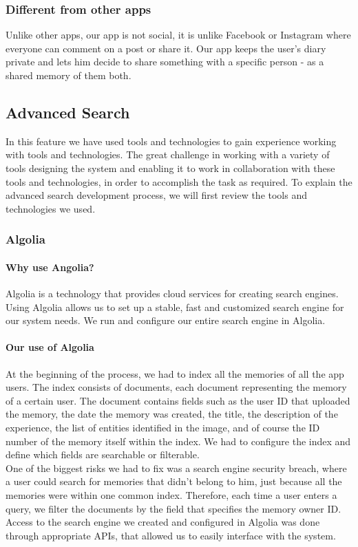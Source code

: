 \documentclass{article}
\begin{document}
 \subsubsection{Different from other apps}
 Unlike other apps, our app is not social, it is unlike Facebook or Instagram where everyone can comment on a post or share it. Our app keeps the user's diary private and lets him decide to share something with a specific person - as a shared memory of them both.

\subsection{Advanced Search}
In this feature we have used tools and technologies to gain experience working with tools and technologies. The great challenge in working with a variety of tools designing the system and enabling it to work in collaboration with these tools and technologies, in order to accomplish the task as required. To explain the advanced search development process, we will first review the tools and technologies we used.
\subsubsection{Algolia}
\paragraph{Why use Angolia?}
Algolia is a technology that provides cloud services for creating search engines. Using Algolia allows us to set up a stable, fast and customized search engine for our system needs. We run and configure our entire search engine in Algolia. 
\paragraph{Our use of Algolia}
At the beginning of the process, we had to index all the memories of all the app users. The index consists of documents, each document representing the memory of a certain user. The document contains fields such as the user ID that uploaded the memory, the date the memory was created, the title, the description of the experience, the list of entities identified in the image, and of course the ID number of the memory itself within the index. We had to configure the index and define which fields are searchable or filterable.\\
One of the biggest risks we had to fix was a search engine security breach, where a user could search for memories that didn't belong to him, just because all the memories were within one common index. Therefore, each time a user enters a query, we filter the documents by the field that specifies the memory owner ID. Access to the search engine we created and configured in Algolia was done through appropriate APIs, that allowed us to easily interface with the system.
\end{document}
